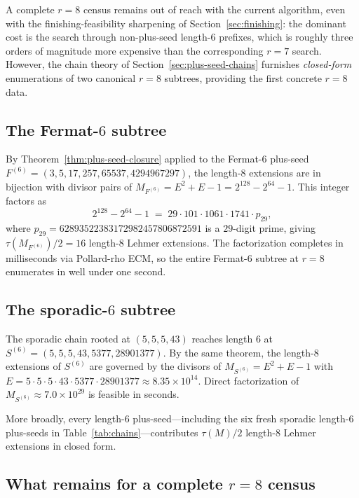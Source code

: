 \documentclass[11pt]{article}
\theoremstyle{definition}
\theoremstyle{remark}
\begin{document}
A complete $r = 8$ census remains out of reach with the current
algorithm, even with the finishing-feasibility sharpening of
Section~\ref{sec:finishing}: the dominant cost is the search through
non-plus-seed length-$6$ prefixes, which is roughly three orders of
magnitude more expensive than the corresponding $r = 7$ search.
However, the chain theory of Section~\ref{sec:plus-seed-chains}
furnishes \emph{closed-form} enumerations of two canonical $r = 8$
subtrees, providing the first concrete $r = 8$ data.

\subsection{The Fermat-$6$ subtree}

By Theorem~\ref{thm:plus-seed-closure} applied to the Fermat-$6$
plus-seed $F^{(6)} = (3, 5, 17, 257, 65537, 4294967297)$, the
length-$8$ extensions are in bijection with divisor pairs of
$M_{F^{(6)}} = E^2 + E - 1 = 2^{128} - 2^{64} - 1$.  This integer
factors as
\[
  2^{128} - 2^{64} - 1
  \;=\;
  29 \cdot 101 \cdot 1061 \cdot 1741 \cdot p_{29},
\]
where $p_{29} = 62893522383172982457806872591$ is a $29$-digit prime,
giving $\tau(M_{F^{(6)}}) / 2 = 16$ length-$8$ Lehmer extensions.
The factorization completes in milliseconds via Pollard-rho ECM, so
the entire Fermat-$6$ subtree at $r = 8$ enumerates in well under one
second.

\subsection{The sporadic-$6$ subtree}

The sporadic chain rooted at $(5, 5, 5, 43)$ reaches length $6$ at
$S^{(6)} = (5, 5, 5, 43, 5377, 28901377)$.  By the same theorem, the
length-$8$ extensions of $S^{(6)}$ are governed by the divisors of
$M_{S^{(6)}} = E^2 + E - 1$ with $E = 5 \cdot 5 \cdot 5 \cdot 43
\cdot 5377 \cdot 28901377 \approx 8.35 \times 10^{14}$.  Direct
factorization of $M_{S^{(6)}} \approx 7.0 \times 10^{29}$ is feasible
in seconds.

More broadly, every length-$6$ plus-seed---including the six fresh
sporadic length-$6$ plus-seeds in Table~\ref{tab:chains}---contributes
$\tau(M)/2$ length-$8$ Lehmer extensions in closed form.

\subsection{What remains for a complete $r = 8$ census}
\end{document}
